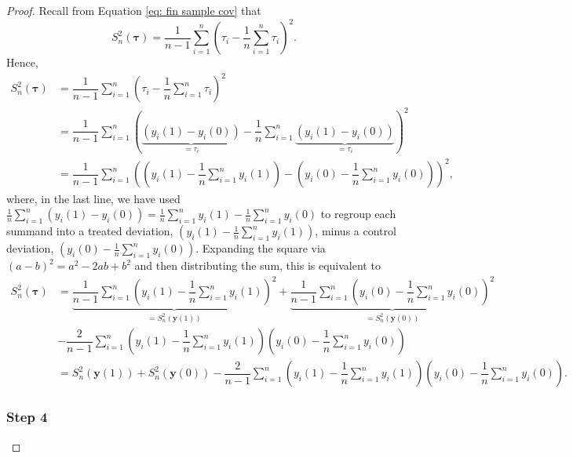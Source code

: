 \documentclass[12pt,leqno]{article}
\theoremstyle{newstyle}
\newcommand{\bZ}{\bm{Z}}   \newcommand{\bz}{\bm{z}}   %
\newcommand{\po}[2]{y_{#1}(#2)}     %
\newcommand{\pov}[1]{\bm{y}(#1)}    %
\newcommand{\Ssq}[2][n]{S_{#1}^{2}(#2)}
\begin{document}
\begin{proof}
Recall from Equation \eqref{eq: fin sample cov} that
\small
\begin{equation*}
\Ssq{\bm{\tau}} = \dfrac{1}{n - 1} \sum \limits_{i = 1}^n \left(\tau_i - \dfrac{1}{n} \sum \limits_{i = 1}^n \tau_i\right)^2.
\end{equation*}
\normalsize
Hence, 
\small
\begin{align*}
\Ssq{\bm{\tau}} & = \dfrac{1}{n - 1} \sum \limits_{i = 1}^n \left(\tau_i - \dfrac{1}{n} \sum \limits_{i = 1}^n \tau_i\right)^2 \\[1ex]
& = \dfrac{1}{n - 1} \sum \limits_{i = 1}^n \left(\underbrace{\left(\po{i}{1} - \po{i}{0}\right)}_{=\tau_i} - \dfrac{1}{n} \sum \limits_{i = 1}^n \underbrace{\left(\po{i}{1} - \po{i}{0}\right)}_{= \tau_i}\right)^2 \\
& = \dfrac{1}{n - 1} \sum \limits_{i = 1}^n \left(\left(\po{i}{1} - \dfrac{1}{n} \sum \limits_{i = 1}^n \po{i}{1}\right) - \left(\po{i}{0} - \dfrac{1}{n} \sum \limits_{i = 1}^n \po{i}{0}\right)\right)^2,
\end{align*}
\normalsize
where, in the last line, we have used $\frac{1}{n}\sum_{i = 1}^n(\po{i}{1} - \po{i}{0}) = \frac{1}{n}\sum_{i = 1}^n \po{i}{1} - \frac{1}{n}\sum_{i = 1}^n \po{i}{0}$ to regroup each summand into a treated deviation, $(\po{i}{1} - \frac{1}{n}\sum_{i = 1}^n \po{i}{1})$, minus a control deviation, $(\po{i}{0} - \frac{1}{n}\sum_{i = 1}^n \po{i}{0})$. Expanding the square via $(a - b)^2 = a^2 - 2ab + b^2$ and then distributing the sum, this is equivalent to
\small
\begin{align*}
\Ssq{\bm{\tau}} & = \underbrace{\dfrac{1}{n - 1} \sum \limits_{i = 1}^n \left(\po{i}{1} - \dfrac{1}{n} \sum \limits_{i = 1}^n \po{i}{1}\right)^2}_{= \Ssq{\pov{1}}} + \underbrace{\dfrac{1}{n - 1} \sum \limits_{i = 1}^n \left(\po{i}{0} - \dfrac{1}{n} \sum \limits_{i = 1}^n \po{i}{0}\right)^2}_{= \Ssq{\pov{0}}} \\ 
& - \dfrac{2}{n - 1} \sum \limits_{i = 1}^n \left(\po{i}{1} - \dfrac{1}{n} \sum \limits_{i = 1}^n \po{i}{1}\right)\left(\po{i}{0} - \dfrac{1}{n} \sum \limits_{i = 1}^n \po{i}{0}\right) \\[1ex]
& = \Ssq{\pov{1}} + \Ssq{\pov{0}} - \dfrac{2}{n - 1} \sum \limits_{i = 1}^n \left(\po{i}{1} - \dfrac{1}{n} \sum \limits_{i = 1}^n \po{i}{1}\right)\left(\po{i}{0} - \dfrac{1}{n} \sum \limits_{i = 1}^n \po{i}{0}\right).
\end{align*}
\normalsize

\subsubsection*{Step 4}


\end{proof}
\end{document}
